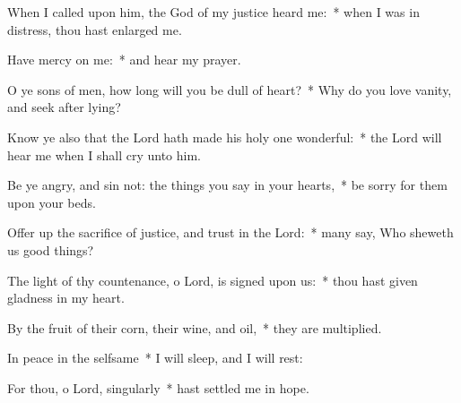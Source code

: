 \begin{enpars}
\item When I called upon him, the God of my justice heard me:~* when I was in distress, thou hast enlarged me.
\item Have mercy on me:~* and hear my prayer.
\item O ye sons of men, how long will you be dull of heart?~* Why do you love vanity, and seek after lying?
\item Know ye also that the Lord hath made his holy one wonderful:~* the Lord will hear me when I shall cry unto him.
\item Be ye angry, and sin not: the things you say in your hearts,~* be sorry for them upon your beds.
\item Offer up the sacrifice of justice, and trust in the Lord:~* many say, Who sheweth us good things?
\item The light of thy countenance, o Lord, is signed upon us:~* thou hast given gladness in my heart.
\item By the fruit of their corn, their wine, and oil,~* they are multiplied.
\item In peace in the selfsame~* I will sleep, and I will rest:
\item For thou, o Lord, singularly~* hast settled me in hope.
\end{enpars}